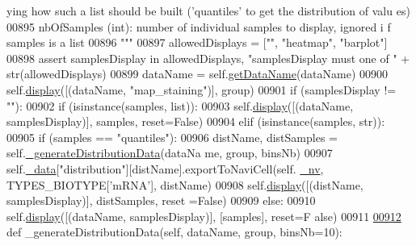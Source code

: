 \begin{DoxyCode}
{      ying how such a list should be built ('quantiles' to get the distribution of valu
      es)}
00895 \textcolor{stringliteral}{            nbOfSamples (int): number of individual samples to display, ignored i
      f samples is a list}
00896 \textcolor{stringliteral}{        """}
00897         allowedDisplays = [\textcolor{stringliteral}{""}, \textcolor{stringliteral}{"heatmap"}, \textcolor{stringliteral}{"barplot"}]
00898         \textcolor{keyword}{assert} samplesDisplay \textcolor{keywordflow}{in} allowedDisplays, \textcolor{stringliteral}{"samplesDisplay must one of "} +
       str(allowedDisplays)
00899         dataName = self.\hyperlink{classnavicom_1_1navicom_1_1NaviCom_a51ecb41beebc7636bde73be2e1ffc407}{getDataName}(dataName)
00900         self.\hyperlink{classnavicom_1_1navicom_1_1NaviCom_ad7d4390d700d4a6d2533647887f8ab94}{display}([(dataName, \textcolor{stringliteral}{"map\_staining"})], group)
00901         \textcolor{keywordflow}{if} (samplesDisplay != \textcolor{stringliteral}{""}):
00902             \textcolor{keywordflow}{if} (isinstance(samples, list)):
00903                 self.\hyperlink{classnavicom_1_1navicom_1_1NaviCom_ad7d4390d700d4a6d2533647887f8ab94}{display}([(dataName, samplesDisplay)], samples, reset=\textcolor{keyword}{False})
00904             \textcolor{keywordflow}{elif} (isinstance(samples, str)):
00905                 \textcolor{keywordflow}{if} (samples == \textcolor{stringliteral}{"quantiles"}):
00906                     distName, distSamples = self.\hyperlink{classnavicom_1_1navicom_1_1NaviCom_a4d7a97aa1699c943238988b8d41b73e0}{_generateDistributionData}(dataNa
      me, group, binsNb)
00907                     self.\hyperlink{classnavicom_1_1navicom_1_1NaviCom_a407b2b5c30a5652ee85c4be54b3e6679}{_data}[\textcolor{stringliteral}{"distribution"}][distName].exportToNaviCell(self.
      \hyperlink{classnavicom_1_1navicom_1_1NaviCom_afff3fd56fa16a68bab52ba8d801e325a}{_nv}, TYPES\_BIOTYPE[\textcolor{stringliteral}{'mRNA'}], distName)
00908                     self.\hyperlink{classnavicom_1_1navicom_1_1NaviCom_ad7d4390d700d4a6d2533647887f8ab94}{display}([(distName, samplesDisplay)], distSamples, reset
      =\textcolor{keyword}{False})
00909                 \textcolor{keywordflow}{else}:
00910                     self.\hyperlink{classnavicom_1_1navicom_1_1NaviCom_ad7d4390d700d4a6d2533647887f8ab94}{display}([(dataName, samplesDisplay)], [samples], reset=\textcolor{keyword}{F
      alse})
00911 
\hypertarget{navicom_8py_source_l00912}{}\hyperlink{classnavicom_1_1navicom_1_1NaviCom_a001dadf6f3dc0c77ba5b14da621b110d}{00912}     \textcolor{keyword}{def }\_generateDistributionData(self, dataName, group, binsNb=10):

\end{DoxyCode}
